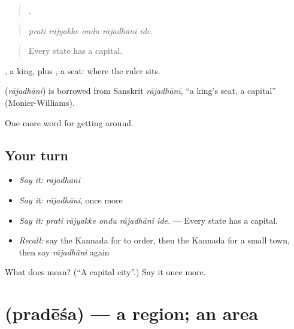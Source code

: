 \begin{quote}
    .
\end{quote}

\begin{quote}
\emph{prati rājyakke ondu rājadhāni ide.}
\end{quote}

\begin{quote}
Every state has a capital.
\end{quote}

, a king, plus , a seat: where the ruler sits.

\begin{cousinweb}
\textbf{} (\emph{rājadhāni}) is borrowed from Sanskrit \emph{rājadhānī}, \textquotedblleft{}a king's seat, a capital\textquotedblright{} (Monier-Williams).
\end{cousinweb}

\begin{grammarlens}[title={What you've built}]
One more word for getting around.
\end{grammarlens}

\subsection*{Your turn}
\begin{itemize}
\raggedright
  \item \emph{Say it:} \emph{rājadhāni}
  \item \emph{Say it:} \emph{rājadhāni}, once more
  \item \emph{Say it:} \emph{prati rājyakke ondu rājadhāni ide.} — Every state has a capital.
  \item \emph{Recall:} say the Kannada for to order, then the Kannada for a small town, then say \emph{rājadhāni} again
\end{itemize}

\begin{tcolorbox}[breakable,colback=teal!4,colframe=teal!35!black,title={Before you move on}]
What does  mean? (\textquotedblleft{}A capital city\textquotedblright{}.) Say it once more.
\end{tcolorbox}
\section[\texorpdfstring{\kn{ಪ್ರದೇಶ} (pradēśa)}{ಪ್ರದೇಶ (pradēśa)}]{ (pradēśa) — a region; an area}

